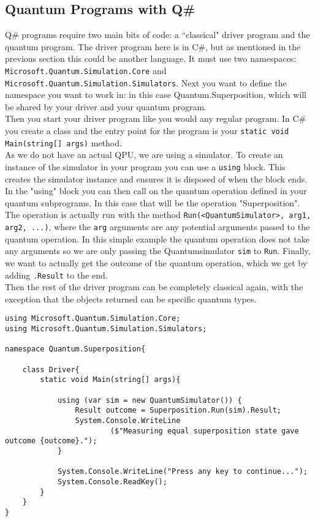 \subsection*{Quantum Programs with Q\#}
Q\# programs require two main bits of code: a ``classical" driver program and the quantum program. The driver program here is in C\#, but as mentioned in the previous section this could be another language. It must use two namespaces: \texttt{Microsoft.Quantum.Simulation.Core} and \\ \texttt{Microsoft.Quantum.Simulation.Simulators}. Next you want to define the namespace you want to work in: in this case Quantum.Superposition, which will be shared by your driver and your quantum program.\\
Then you start your driver program like you would any regular program. In C\# you create a class and the entry point for the program is your \texttt{static void Main(string[] args)} method.\\
As we do not have an actual QPU, we are using a simulator. To create an instance of the simulator in your program you can use a \texttt{using} block. This creates the simulator instance and ensures it is disposed of when the block ends.\\
In the "using" block you can then call on the quantum operation defined in your quantum subprograms. In this case that will be the operation "Superposition". The operation is actually run with the method \texttt{Run(<QuantumSimulator>, arg1, arg2, ...)}, where the \texttt{arg} arguments are any potential arguments passed to the quantum operation. In this simple example the quantum operation does not take any arguments so we are only passing the Quantumsimulator \texttt{sim} to \texttt{Run}. Finally, we want to actually get the outcome of the quantum operation, which we get by adding \texttt{.Result} to the end.\\
Then the rest of the driver program can be completely classical again, with the exception that the objects returned can be specific quantum types.\\


\begin{lstlisting}[language=Csharp,caption={Starting a driver program for Q\#},label={lst:C\#driverSimple}] 
using Microsoft.Quantum.Simulation.Core;
using Microsoft.Quantum.Simulation.Simulators;

namespace Quantum.Superposition{

    class Driver{
        static void Main(string[] args){

            using (var sim = new QuantumSimulator()) {
                Result outcome = Superposition.Run(sim).Result;
                System.Console.WriteLine
                        ($"Measuring equal superposition state gave outcome {outcome}.");
            }

            System.Console.WriteLine("Press any key to continue...");
            System.Console.ReadKey();
        }
    }
}
\end{lstlisting}

